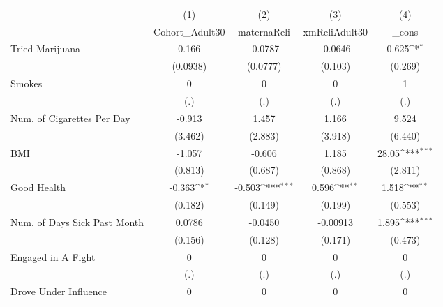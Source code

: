 {
\def\sym#1{\ifmmode^{#1}\else\(^{#1}\)\fi}
\begin{tabular}{l*{4}{c}}
\hline\hline
            &\multicolumn{1}{c}{(1)}&\multicolumn{1}{c}{(2)}&\multicolumn{1}{c}{(3)}&\multicolumn{1}{c}{(4)}\\
            &\multicolumn{1}{c}{Cohort\_Adult30}&\multicolumn{1}{c}{maternaReli}&\multicolumn{1}{c}{xmReliAdult30}&\multicolumn{1}{c}{\_cons}\\
\hline
Tried Marijuana&       0.166         &     -0.0787         &     -0.0646         &       0.625\sym{*}  \\
            &    (0.0938)         &    (0.0777)         &     (0.103)         &     (0.269)         \\
[1em]
Smokes      &           0         &           0         &           0         &           1         \\
            &         (.)         &         (.)         &         (.)         &         (.)         \\
[1em]
Num. of Cigarettes Per Day&      -0.913         &       1.457         &       1.166         &       9.524         \\
            &     (3.462)         &     (2.883)         &     (3.918)         &     (6.440)         \\
[1em]
BMI         &      -1.057         &      -0.606         &       1.185         &       28.05\sym{***}\\
            &     (0.813)         &     (0.687)         &     (0.868)         &     (2.811)         \\
[1em]
Good Health &      -0.363\sym{*}  &      -0.503\sym{***}&       0.596\sym{**} &       1.518\sym{**} \\
            &     (0.182)         &     (0.149)         &     (0.199)         &     (0.553)         \\
[1em]
Num. of Days Sick Past Month&      0.0786         &     -0.0450         &    -0.00913         &       1.895\sym{***}\\
            &     (0.156)         &     (0.128)         &     (0.171)         &     (0.473)         \\
[1em]
Engaged in A Fight&           0         &           0         &           0         &           0         \\
            &         (.)         &         (.)         &         (.)         &         (.)         \\
[1em]
Drove Under Influence&           0         &           0         &           0         &           0         \\

\end{tabular}}
